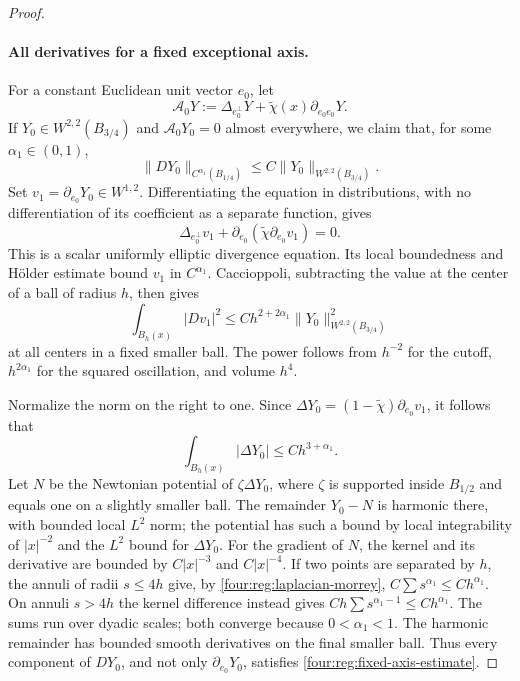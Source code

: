 \begin{proof}
\paragraph{All derivatives for a fixed exceptional axis.}
For a constant Euclidean unit vector $e_0$, let
\begin{equation}\label{four:reg:fixed-axis-operator}
 \mathcal A_0Y:=\Delta_{e_0^\perp}Y
                 +\widetilde\chi(x)\partial_{e_0e_0}Y.
\end{equation}
If $Y_0\in W^{2,2}(B_{3/4})$ and $\mathcal A_0Y_0=0$ almost
everywhere, we claim that, for some $\alpha_1\in(0,1)$,
\begin{equation}\label{four:reg:fixed-axis-estimate}
 \|DY_0\|_{C^{\alpha_1}(B_{1/4})}
       \le C\|Y_0\|_{W^{2,2}(B_{3/4})}.
\end{equation}
Set $v_1=\partial_{e_0}Y_0\in W^{1,2}$.  Differentiating the
equation in distributions, with no differentiation of its
coefficient as a separate function, gives
\[
 \Delta_{e_0^\perp}v_1+\partial_{e_0}
                (\widetilde\chi\partial_{e_0}v_1)=0.
\]
This is a scalar uniformly elliptic divergence equation.  Its local
boundedness and H\"older estimate bound $v_1$ in $C^{\alpha_1}$.
Caccioppoli, subtracting the value at the center of a ball of radius
$h$, then gives
\begin{equation}\label{four:reg:fixed-axis-morrey}
 \int_{B_h(x)}|Dv_1|^2\le Ch^{2+2\alpha_1}
                   \|Y_0\|_{W^{2,2}(B_{3/4})}^2
\end{equation}
at all centers in a fixed smaller ball.  The power follows from
$h^{-2}$ for the cutoff, $h^{2\alpha_1}$ for the squared
oscillation, and volume $h^4$.

Normalize the norm on the right to one.  Since
$\Delta Y_0=(1-\widetilde\chi)\partial_{e_0}v_1$, it follows that
\begin{equation}\label{four:reg:laplacian-morrey}
 \int_{B_h(x)}|\Delta Y_0|\le Ch^{3+\alpha_1}.
\end{equation}
Let $N$ be the Newtonian potential of $\zeta\Delta Y_0$, where
$\zeta$ is supported inside $B_{1/2}$ and equals one on a slightly
smaller ball.  The remainder $Y_0-N$ is harmonic there, with bounded
local $L^2$ norm; the potential has such a bound by local integrability
of $|x|^{-2}$ and the $L^2$ bound for $\Delta Y_0$.  For the gradient
of $N$, the kernel and its derivative are bounded by $C|x|^{-3}$
and $C|x|^{-4}$.  If two points are separated by $h$, the annuli of
radii $s\le4h$ give, by \eqref{four:reg:laplacian-morrey},
$C\sum s^{\alpha_1}\le Ch^{\alpha_1}$.  On annuli $s>4h$ the
kernel difference instead gives
$Ch\sum s^{\alpha_1-1}\le Ch^{\alpha_1}$.
The sums run over dyadic scales; both converge because
$0<\alpha_1<1$.  The harmonic remainder has bounded smooth
derivatives on the final smaller ball.  Thus every component of
$DY_0$, and not only $\partial_{e_0}Y_0$, satisfies
\eqref{four:reg:fixed-axis-estimate}.


\end{proof}
